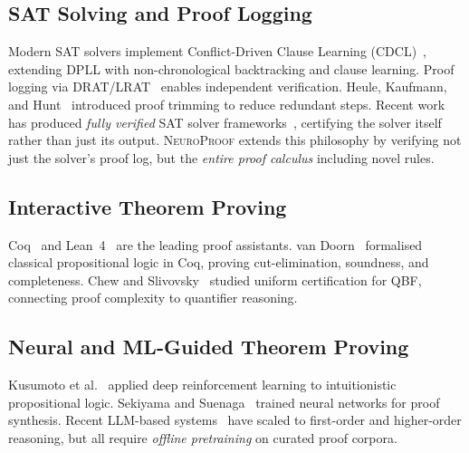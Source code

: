 \documentclass[conference]{IEEEtran}
\newcommand{\NP}{\textsc{NeuroProof}}
\begin{document}
\subsection{SAT Solving and Proof Logging}

Modern SAT solvers implement Conflict-Driven Clause Learning
(CDCL)~\cite{Marques-Silva1999,EenSorensson2003}, extending DPLL
with non-chronological backtracking and clause learning.
Proof logging via DRAT/LRAT~\cite{HeuleHuntMahmoud2017,
GochtNordstrom2022,LammichLRAT2024} enables independent verification.
Heule, Kaufmann, and Hunt~\cite{HeuleKaufmann2023} introduced
proof trimming to reduce redundant steps.
Recent work has produced \emph{fully verified} SAT solver
frameworks~\cite{FleuryVerifiedSAT2025}, certifying the solver
itself rather than just its output.  \NP{} extends this philosophy
by verifying not just the solver's proof log, but the \emph{entire
proof calculus} including novel rules.

\subsection{Interactive Theorem Proving}

Coq~\cite{CoqDevelopmentTeam2024} and
Lean~4~\cite{MouraKong2021} are the leading proof assistants.
van Doorn~\cite{vanDoorn2015} formalised classical propositional
logic in Coq, proving cut-elimination, soundness, and completeness.
Chew and Slivovsky~\cite{ChewSlivovsky2024} studied uniform
certification for QBF, connecting proof complexity to quantifier
reasoning.

\subsection{Neural and ML-Guided Theorem Proving}

Kusumoto et al.~\cite{KusumoYahata2018} applied deep reinforcement
learning to intuitionistic propositional logic.
Sekiyama and Suenaga~\cite{SekiyamaSuenaga2018} trained neural
networks for proof synthesis.  Recent LLM-based
systems~\cite{DeepSeekProver2024,SongYangAnandkumar2024,LiSurvey2024,
AnLLM2024,ZhaoSubgoalXL2024,DongMahankali2024,KumarappanLeanAgent2024,
AlphaProof2025,DeepSeekProverV2,ZhaoProverAgent2025}
have scaled to first-order and higher-order reasoning, but all require
\emph{offline pretraining} on curated proof corpora.
\end{document}
